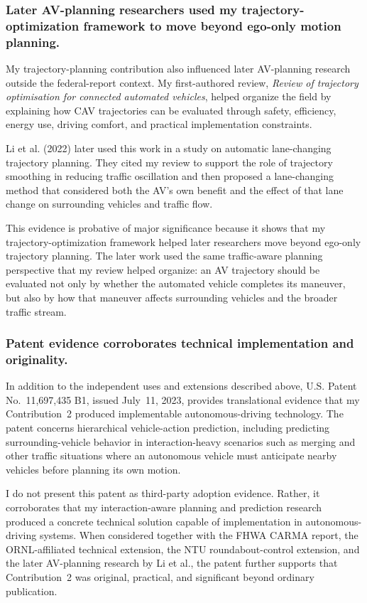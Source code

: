 \documentclass[11pt,letterpaper]{article}
\begin{document}
\subsubsection{Later AV-planning researchers used my trajectory-optimization framework to move beyond ego-only motion planning.}

My trajectory-planning contribution also influenced later AV-planning research outside the federal-report context. My first-authored review, \textit{Review of trajectory optimisation for connected automated vehicles}, helped organize the field by explaining how CAV trajectories can be evaluated through safety, efficiency, energy use, driving comfort, and practical implementation constraints.

Li et al. (2022) later used this work in a study on automatic lane-changing trajectory planning. They cited my review to support the role of trajectory smoothing in reducing traffic oscillation and then proposed a lane-changing method that considered both the AV's own benefit and the effect of that lane change on surrounding vehicles and traffic flow.

This evidence is probative of major significance because it shows that my trajectory-optimization framework helped later researchers move beyond ego-only trajectory planning. The later work used the same traffic-aware planning perspective that my review helped organize: an AV trajectory should be evaluated not only by whether the automated vehicle completes its maneuver, but also by how that maneuver affects surrounding vehicles and the broader traffic stream.

\subsubsection{Patent evidence corroborates technical implementation and originality.}

In addition to the independent uses and extensions described above, U.S. Patent No.~11,697,435 B1, issued July~11, 2023, provides translational evidence that my Contribution~2 produced implementable autonomous-driving technology. The patent concerns hierarchical vehicle-action prediction, including predicting surrounding-vehicle behavior in interaction-heavy scenarios such as merging and other traffic situations where an autonomous vehicle must anticipate nearby vehicles before planning its own motion.

I do not present this patent as third-party adoption evidence. Rather, it corroborates that my interaction-aware planning and prediction research produced a concrete technical solution capable of implementation in autonomous-driving systems. When considered together with the FHWA CARMA report, the ORNL-affiliated technical extension, the NTU roundabout-control extension, and the later AV-planning research by Li et al., the patent further supports that Contribution~2 was original, practical, and significant beyond ordinary publication.
\end{document}
